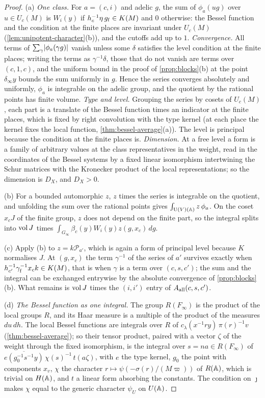 \begin{proof}
(a) \emph{One class.} For $a=(c,i)$ and adelic $g$, the sum of $\phi_a(ug)$ over $u\in U_c(M)$ is $W_i(y)$ if $h_c^{-1}\eta\,g_{\rm f}\in K(M)$ and $0$ otherwise: the Bessel function and the condition at the finite places are invariant under $U_c(M)$
(\cref{lem:unipotent-character}(b)), and the cutoffs add up to $1$. \emph{Convergence.} All terms of $\sum_\gamma\lvert \phi_a(\gamma g)\rvert$ vanish unless some $\delta$ satisfies the level condition at the finite places; writing the terms as $\gamma^{-1}\delta$, those that do not
vanish are terms over $(c,1,c)$, and the uniform bound in the proof of \cref{prop:blocks}(b) at the point $\delta_\infty y$ bounds the sum uniformly in $g$. Hence the series converges absolutely and uniformly, $\phi_a$ is integrable on the adelic group, and the quotient
by the rational points has finite volume. \emph{Type and level.} Grouping the series by cosets of $U_c(M)$, each part is a translate of the Bessel function times an indicator at the finite places, which is fixed by right convolution with the type kernel
(at each place the kernel fixes the local function, \cref{thm:bessel-average}(a)). The level is principal because the condition at the finite places is. \emph{Dimension.} At a free level a form is a family of arbitrary values at the class representatives in the
weight, read in the coordinates of the Bessel systems by a fixed linear isomorphism intertwining the Schur matrices with the Kronecker product of the local representations; so the dimension is $D_X$, and $D_X>0$.

(b) For a bounded automorphic $z$, $z$ times the series is integrable on the quotient, and unfolding the sum over the rational points gives $\int_{\operatorname{U}(V)(\mathbb{A})}z\,\phi_a$. On the coset $x_cJ$ of the finite group, $z$ does not depend on the finite part, so the integral
splits into $\operatorname{vol} J$ times $\int_{G_\infty}\beta_c(y)W_i(y)z(g,x_c)\,dg$.

(c) Apply (b) to $z=k\mathcal P_{a'}$, which is again a form of principal level because $K$ normalises $J$. At $(g,x_c)$ the term $\gamma^{-1}$ of the series of $a'$ survives exactly when $h_{c'}^{-1}\gamma_{\rm f}^{-1}x_ck\in K(M)$, that is when $\gamma$ is a term over $(c,s,c')$; the
sum and the integral can be exchanged entrywise by the absolute convergence of \cref{prop:blocks}(b). What remains is $\operatorname{vol} J$ times the $(i,i')$ entry of $A_{\rm all}(c,s,c')$.

(d) \emph{The Bessel function as one integral.} The group $R(F_\infty)$ is the product of the local groups $R$, and its Haar measure is a multiple of the product of the measures $du\,dh$. The local Bessel functions are integrals over $R$ of $c_\lambda(x^{-1}ry)\,\pi(r)^{-1}v$
(\cref{thm:bessel-average}); so their tensor product, paired with a vector $\zeta$ of the weight through the fixed isomorphism, is the integral over $s=na\in R(F_\infty)$ of $\overline{e(g_0^{-1}s^{-1}y)}\,\chi(s)^{-1}\,t(a\zeta)$, with $e$ the type kernel, $g_0$ the point with components $x_v$,
$\chi$ the character $r\mapsto\psi(-\sigma(r)/(M\varpi))$ of $R(\mathbb{A})$, which is trivial on $H(\mathbb{A})$, and $t$ a linear form absorbing the constants. The condition on $\jmath$ makes $\chi$ equal to the generic character $\psi_U$ on $U(\mathbb{A})$.


\end{proof}
